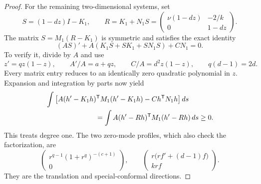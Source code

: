 \documentclass[11pt,a4paper]{article}
\theoremstyle{remark}
\begin{document}
\begin{proof}
For the remaining two-dimensional systems, set
\[
 S=(1-dz)I-K_1,
 \qquad
 R=K_1+N_1S
 =\begin{pmatrix}\nu(1-dz)&-2/k\\0&1-dz\end{pmatrix}.
\]
The matrix $S=M_1(R-K_1)$ is symmetric and satisfies the exact identity
\begin{equation}\label{eq:911-riccati}
 (AS)'+A(K_1S+SK_1+SN_1S)+CN_1=0.
\end{equation}
To verify it, divide by $A$ and use
\[
 z'=qz(1-z),\qquad A'/A=a+qz,\qquad C/A=d^2z(1-z),
 \qquad q(d-1)=2d.
\]
Every matrix entry reduces to an identically zero quadratic polynomial
in $z$. Expansion and integration by parts now yield
\begin{align}
 &\int\left[A(h'-K_1h)^{\mathsf T}M_1(h'-K_1h)
             -C h^{\mathsf T}N_1h\right]ds\notag\\
 &\hspace{25mm}=\int A(h'-Rh)^{\mathsf T}M_1(h'-Rh)\,ds\ge0.
 \label{eq:911-l1factor}
\end{align}
This treats degree one. The two zero-mode profiles, which also check the
factorization, are
\[
 \begin{pmatrix}r^{q-1}(1+r^q)^{-(c+1)}\\0\end{pmatrix},\qquad
 \begin{pmatrix}r\bigl(rf'+(d-1)f\bigr)\\k r f\end{pmatrix}.
\]
They are the translation and special-conformal directions.


\end{proof}
\end{document}
